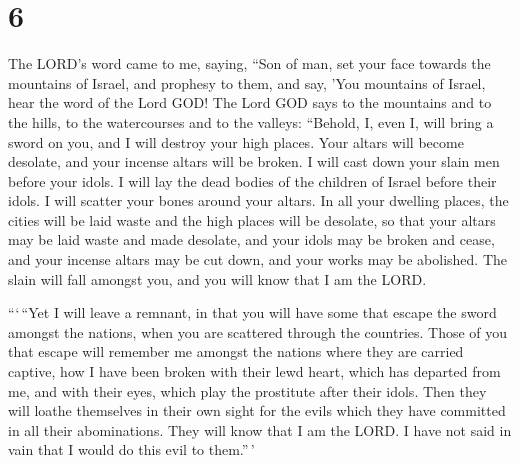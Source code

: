\hypertarget{section-5}{%
\section{6}\label{section-5}}

 The LORD's word came to me, saying,  ``Son of
man, set your face towards the mountains of Israel, and prophesy to
them,  and say, 'You mountains of Israel, hear the word of
the Lord GOD! The Lord GOD says to the mountains and to the hills, to
the watercourses and to the valleys: ``Behold, I, even I, will bring a
sword on you, and I will destroy your high places.  Your
altars will become desolate, and your incense altars will be broken. I
will cast down your slain men before your idols.  I will lay
the dead bodies of the children of Israel before their idols. I will
scatter your bones around your altars.  In all your dwelling
places, the cities will be laid waste and the high places will be
desolate, so that your altars may be laid waste and made desolate, and
your idols may be broken and cease, and your incense altars may be cut
down, and your works may be abolished.  The slain will fall
amongst you, and you will know that I am the LORD.

 ```\,``Yet I will leave a remnant, in that you will have
some that escape the sword amongst the nations, when you are scattered
through the countries.  Those of you that escape will
remember me amongst the nations where they are carried captive, how I
have been broken with their lewd heart, which has departed from me, and
with their eyes, which play the prostitute after their idols. Then they
will loathe themselves in their own sight for the evils which they have
committed in all their abominations.  They will know that I
am the LORD. I have not said in vain that I would do this evil to
them.''\,'

